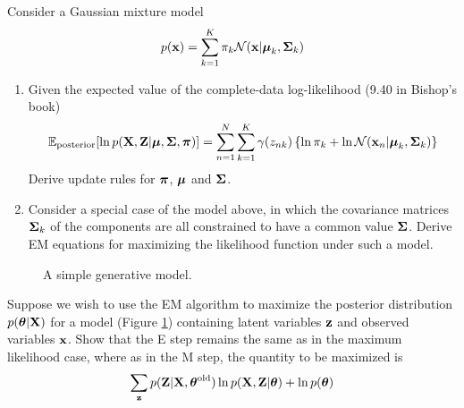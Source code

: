 \documentclass{amsmlaj}
\begin{document}


\begin{problem}
Consider a Gaussian mixture model
$$
p(\bm{\mathbf{x}}) = \sum_{k=1}^K  \pi_k \mathcal{N}(\bm{\mathbf{x}}|\bm{\mathbf{\mu}}_k,\bm{\mathbf{\Sigma}}_k)
$$
\begin{enumerate}
\item Given the expected value of the complete-data log-likelihood (9.40 in Bishop's book)
$$
\mathbb{E}_{\text{posterior}}[\ln p(\bm{\mathbf{X}},\bm{\mathbf{Z}}|\bm{\mathbf{\mu}}, \bm{\mathbf{\Sigma}},\bm{\mathbf{\pi}})] = \sum_{n=1}^N\sum_{k=1}^K \gamma(z_{nk}) \left\{ \ln\pi_k + \ln\mathcal{N}(\bm{\mathbf{x}}_n|\bm{\mathbf{\mu}}_k,\bm{\mathbf{\Sigma}}_k)\right\} \label{eq:ex_post}
$$
Derive update rules for $\bm{\mathbf{\pi}}$, $\bm{\mathbf{\mu}}$ and $\bm{\mathbf{\Sigma}}$. 

\item Consider a special case of the model above, in which the covariance matrices $\bm{\mathbf{\Sigma}}_k$ of the components are all constrained to have a common value $\bm{\mathbf{\Sigma}}$. Derive EM equations for maximizing the likelihood function under such a model.
\end{enumerate}

\end{problem}

\begin{problem}
\begin{figure}[htbp]
\centering
{}
\caption{A simple generative model.}
\label{fig:gm}
\end{figure}
Suppose we wish to use the EM algorithm to maximize the posterior distribution $p(\bm{\mathbf{\theta}}|\bm{\mathbf{X}})$ for a model (Figure \ref{fig:gm}) containing latent variables $\bm{\mathbf{z}}$ and observed variables $\bm{\mathbf{x}}$. Show that the E step remains the same as in the maximum likelihood case, where as in the M step, the quantity to be maximized is
$$
\sum_{\bm{\mathbf{z}}} p(\bm{\mathbf{Z}}|\bm{\mathbf{X}},\bm{\mathbf{\theta}}^{\text{old}})\ln p(\bm{\mathbf{X}},\bm{\mathbf{Z}}|\bm{\mathbf{\theta}}) + \ln p(\bm{\mathbf{\theta}})
$$
\end{problem}
\end{document}
